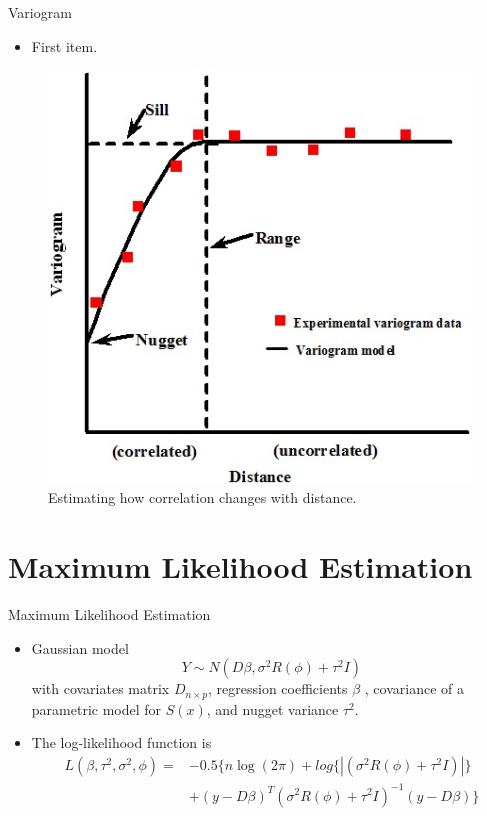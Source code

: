 \documentclass{beamer}
\begin{document}
\begin{frame}{Variogram}
  \begin{itemize}
  \item {
    First item.
      }
  \end{itemize}
  	\begin{figure}
	\centering
		\includegraphics[scale = 0.5]{Images/VariogramSummary.jpg}
		\caption{ { \scriptsize Estimating how correlation changes with distance.}}
	\end{figure} 
\end{frame}


\section{Maximum Likelihood Estimation}
\begin{frame}{Maximum Likelihood Estimation}
	\begin{itemize}
		\item Gaussian model
		$$Y \sim N(D\beta, \sigma^2 R(\phi) + \tau^2I) $$
		with covariates matrix $D_{n\times p}$, regression coefficients $\beta$ ,  covariance of a parametric model for $S(x)$, and nugget variance $\tau^2$. 
		\item The log-likelihood function is 
		\begin{align*}
		L(\beta, \tau^2, \sigma^2, \phi) =  &- 0.5 \{n \log(2\pi) + log\{|(\sigma^2 R(\phi) +\tau^2 I) | \} \\
		&+ (y-D\beta)^T(\sigma^2 R(\phi) + \tau^2 I)^{-1} (y - D\beta)\}
		\end{align*}
	\end{itemize}
\end{frame}
\end{document}
